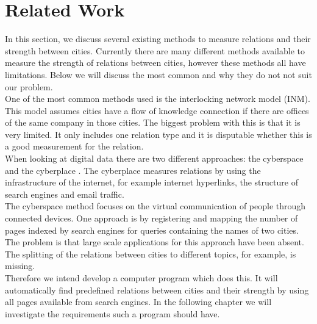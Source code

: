 \section{Related Work}
In this section, we discuss several existing methods to measure relations and their strength between cities. Currently there are many different methods available to measure the strength of relations between cities, however these methods all have limitations. Below we will discuss the most common and why they do not not suit our problem.\\

One of the most common methods used is the interlocking network model (INM)\cite{taylor2012interlocking}. This model assumes cities have a flow of knowledge connection if there are offices of the same company in those cities. The biggest problem with this is that it is very limited. It only includes one relation type and it is disputable whether this is a good measurement for the relation. \\

When looking at digital data there are two different approaches: the cyberspace and the cyberplace \cite{devriendt2008cyberplace}. The cyberplace measures relations by using the infrastructure of the internet, for example internet hyperlinks, the structure of search engines and email traffic.\\
The cyberspace method focuses on the virtual communication of people through connected devices. One approach is by registering and mapping the number of pages indexed by search engines for queries containing the names of two cities. The problem is that large scale applications for this approach have been absent. The splitting of the relations between cities to different topics, for example, is missing. \\

Therefore we intend develop a computer program which does this. It will automatically find predefined relations between cities and their strength by using all pages available from search engines. In the following chapter we will investigate the requirements such a program should have.

